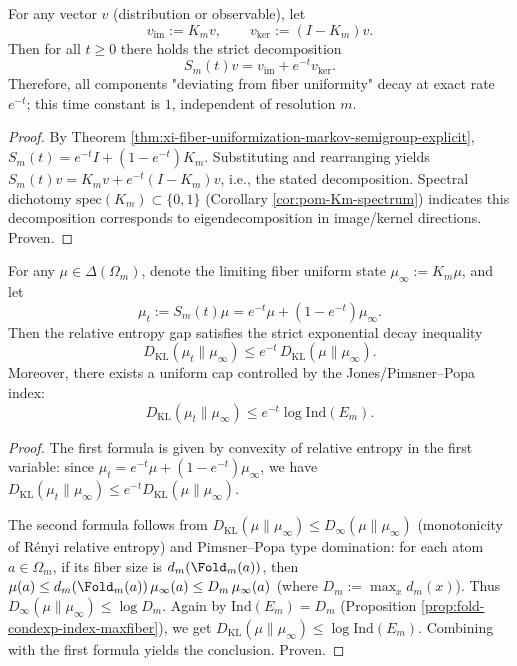 \begin{proposition}\label{prop:xi-fiber-uniformization-spectral-decay-equals-exp}
For any vector \(v\) (distribution or observable), let
\[
v_{\mathrm{im}}:=K_m v,\qquad v_{\ker}:=(I-K_m)v.
\]
Then for all \(t\ge 0\) there holds the strict decomposition
\[
\boxed{\;
S_m(t)v=v_{\mathrm{im}}+e^{-t}v_{\ker}.
\;}
\]
Therefore, all components "deviating from fiber uniformity" decay at exact rate \(e^{-t}\); this time constant is \(1\), independent of resolution \(m\).
\end{proposition}
\begin{proof}
By Theorem \ref{thm:xi-fiber-uniformization-markov-semigroup-explicit},
\(
S_m(t)=e^{-t}I+(1-e^{-t})K_m
\).
Substituting and rearranging yields
\(
S_m(t)v=K_mv+e^{-t}(I-K_m)v
\), i.e., the stated decomposition.
Spectral dichotomy \(\mathrm{spec}(K_m)\subset\{0,1\}\) (Corollary \ref{cor:pom-Km-spectrum}) indicates this decomposition corresponds to eigendecomposition in image/kernel directions. Proven.
\end{proof}

\begin{proposition}\label{prop:xi-fiber-uniformization-kl-gap-exp-decay-index-cap}
For any \(\mu\in\Delta(\Omega_m)\), denote the limiting fiber uniform state \(\mu_\infty:=K_m\mu\), and let
\[
\mu_t:=S_m(t)\mu=e^{-t}\mu+(1-e^{-t})\mu_\infty.
\]
Then the relative entropy gap satisfies the strict exponential decay inequality
\[
\boxed{\;
D_{\mathrm{KL}}(\mu_t\|\mu_\infty)\le e^{-t}\,D_{\mathrm{KL}}(\mu\|\mu_\infty).\;}
\]
Moreover, there exists a uniform cap controlled by the Jones/Pimsner--Popa index:
\[
\boxed{\;
D_{\mathrm{KL}}(\mu_t\|\mu_\infty)\le e^{-t}\log\mathrm{Ind}(E_m).\;}
\]
\end{proposition}
\begin{proof}
The first formula is given by convexity of relative entropy in the first variable:
since \(\mu_t=e^{-t}\mu+(1-e^{-t})\mu_\infty\), we have
\(
D_{\mathrm{KL}}(\mu_t\|\mu_\infty)\le e^{-t}D_{\mathrm{KL}}(\mu\|\mu_\infty)
\).
\par
The second formula follows from
\(
D_{\mathrm{KL}}(\mu\|\mu_\infty)\le D_\infty(\mu\|\mu_\infty)
\)
(monotonicity of Rényi relative entropy) and Pimsner--Popa type domination: for each atom \(a\in\Omega_m\), if its fiber size is \(d_m(\Fold_m(a))\), then
\(
\mu(a)\le d_m(\Fold_m(a))\,\mu_\infty(a)\le D_m\,\mu_\infty(a)
\)
(where \(D_m:=\max_x d_m(x)\)).
Thus \(D_\infty(\mu\|\mu_\infty)\le \log D_m\).
Again by \(\mathrm{Ind}(E_m)=D_m\) (Proposition \ref{prop:fold-condexp-index-maxfiber}), we get
\(
D_{\mathrm{KL}}(\mu\|\mu_\infty)\le \log\mathrm{Ind}(E_m)
\).
Combining with the first formula yields the conclusion. Proven.
\end{proof}


